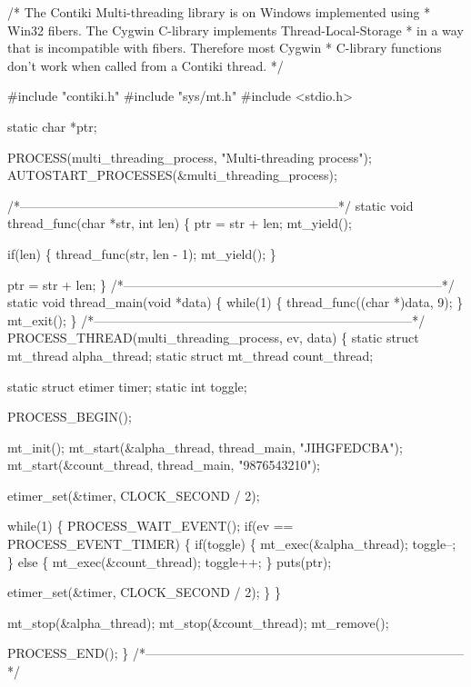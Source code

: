 \begin{DoxyCodeInclude}
\textcolor{comment}{/* The Contiki Multi-threading library is on Windows implemented using}
\textcolor{comment}{ * Win32 fibers. The Cygwin C-library implements Thread-Local-Storage}
\textcolor{comment}{ * in a way that is incompatible with fibers. Therefore most Cygwin}
\textcolor{comment}{ * C-library functions don't work when called from a Contiki thread. */}

\textcolor{preprocessor}{#include "contiki.h"}
\textcolor{preprocessor}{#include "sys/mt.h"}
\textcolor{preprocessor}{#include <stdio.h>}

\textcolor{keyword}{static} \textcolor{keywordtype}{char} *ptr;

PROCESS(multi\_threading\_process, \textcolor{stringliteral}{"Multi-threading process"});
AUTOSTART\_PROCESSES(&multi\_threading\_process);

\textcolor{comment}{/*---------------------------------------------------------------------------*/}
\textcolor{keyword}{static} \textcolor{keywordtype}{void}
thread\_func(\textcolor{keywordtype}{char} *str, \textcolor{keywordtype}{int} len)
\{
  ptr = str + len;
  mt\_yield();

  \textcolor{keywordflow}{if}(len) \{
    thread\_func(str, len - 1);
    mt\_yield();
  \}

  ptr = str + len;
\}
\textcolor{comment}{/*---------------------------------------------------------------------------*/}
\textcolor{keyword}{static} \textcolor{keywordtype}{void}
thread\_main(\textcolor{keywordtype}{void} *data)
\{
  \textcolor{keywordflow}{while}(1) \{
    thread\_func((\textcolor{keywordtype}{char} *)data, 9);
  \}
  mt\_exit();
\}
\textcolor{comment}{/*---------------------------------------------------------------------------*/}
PROCESS\_THREAD(multi\_threading\_process, ev, data)
\{
  \textcolor{keyword}{static} \textcolor{keyword}{struct }mt\_thread alpha\_thread;
  \textcolor{keyword}{static} \textcolor{keyword}{struct }mt\_thread count\_thread;

  \textcolor{keyword}{static} \textcolor{keyword}{struct }etimer timer;
  \textcolor{keyword}{static} \textcolor{keywordtype}{int} toggle;

  PROCESS\_BEGIN();

  mt\_init();
  mt\_start(&alpha\_thread, thread\_main, \textcolor{stringliteral}{"JIHGFEDCBA"});
  mt\_start(&count\_thread, thread\_main, \textcolor{stringliteral}{"9876543210"});

  etimer\_set(&timer, CLOCK\_SECOND / 2);

  \textcolor{keywordflow}{while}(1) \{
    PROCESS\_WAIT\_EVENT();
    \textcolor{keywordflow}{if}(ev == PROCESS\_EVENT\_TIMER) \{
      \textcolor{keywordflow}{if}(toggle) \{
        mt\_exec(&alpha\_thread);
        toggle--;
      \} \textcolor{keywordflow}{else} \{
        mt\_exec(&count\_thread);
        toggle++;
      \}
      puts(ptr);

      etimer\_set(&timer, CLOCK\_SECOND / 2);
    \}
  \}
  
  mt\_stop(&alpha\_thread);
  mt\_stop(&count\_thread);
  mt\_remove();

  PROCESS\_END();
\}
\textcolor{comment}{/*---------------------------------------------------------------------------*/}
\end{DoxyCodeInclude}
 